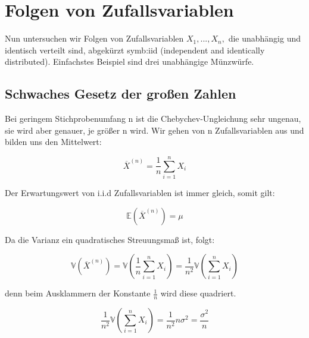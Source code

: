 {    

    \ifdefined\uebsps
    
    
    
    
    
    \fi

    \section{Folgen von Zufallsvariablen}

    Nun untersuchen wir Folgen von Zufallsvariablen $X_{1},...,X_{n},$ die unabhängig und identisch
    verteilt sind, abgekürzt \gls{symb:iid} (independent and identically distributed). 
    Einfachstes Beispiel sind drei unabhängige Münzwürfe.

    \subsection{Schwaches Gesetz der großen Zahlen}

    Bei geringem Stichprobenumfang n ist die Chebychev-Ungleichung sehr
    ungenau, sie wird aber genauer, je größer n wird. Wir gehen von n
    Zufallsvariablen aus und bilden uns den Mittelwert:

    \[\overline{X}^{\left(n\right)}=\frac{1}{n}\sum_{i=1}^{n}X_{i}\]

    Der Erwartungswert von i.i.d Zufallsvariablen ist immer gleich, somit gilt:

    \[\mathbb E\left(\overline{X}^{\left(n\right)}\right)=\mu\]

    Da die Varianz ein quadratisches Streuungsmaß ist, folgt:

    \[\mathbb V\left(\overline{X}^{\left(n\right)}\right)=
        \mathbb V\left(\frac{1}{n}\sum_{i=1}^{n}X_{i}\right)=
        \frac{1}{n^{2}}\mathbb V\left(\sum_{i=1}^{n}X_{i}\right)\]

    denn beim Ausklammern der Konstante $\frac{1}{n}$ wird diese quadriert.

    \[\frac{1}{n^{2}}\mathbb V\left(\sum_{i=1}^{n}X_{i}\right)=\frac{1}{n^{2}}n\sigma ^{2}=\frac{\sigma^{2}}{n}\]


}
